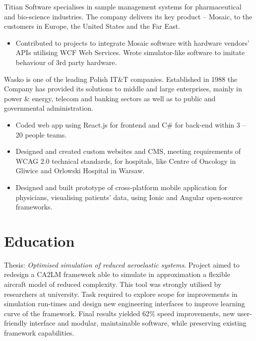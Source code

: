\documentclass[12pt,english]{resume}
\begin{document}
		Titian Software specialises in sample management systems for pharmaceutical and bio-science industries. The company delivers its key product – Mosaic, to the customers in Europe, the United States and the Far East.
		\begin{itemize}
			\item Contributed to projects to integrate Mosaic software with hardware vendors’ APIs utilising WCF Web Services. Wrote simulator-like software to imitate behaviour of 3rd party hardware.
		\end{itemize}
		
		Wasko is one of the leading Polish IT\&T companies. Established in 1988 the Company has provided its solutions to middle and large enterprises, mainly in power \& energy, telecom and banking sectors as well as to public and governmental administration.
		\begin{itemize}
			\item Coded web app using React.js for frontend and C\# for back-end within 3 – 20 people teams.
			\item Designed and created custom websites and CMS, meeting requirements of WCAG 2.0 technical standards, for hospitals, like Centre of Oncology in Gliwice and Orlowski Hospital in Warsaw.
			\item Designed and built prototype of cross-platform mobile application for physicians, visualising patients’ data, using Ionic and Angular open-source frameworks.
		\end{itemize}
	
	\section{Education}


			\noindent
			Thesis: \emph{Optimised simulation of reduced aeroelastic systems}.
			Project aimed to redesign a CA2LM framework able to simulate in approximation a flexible aircraft model of reduced complexity. This tool was strongly utilised by researchers at university. Task required to explore scope for improvements in simulation run-times and design new engineering interfaces to improve learning curve of the framework. Final results yielded 62\% speed improvements, new user-friendly interface and modular, maintainable software, while preserving existing framework capabilities.
\end{document}
